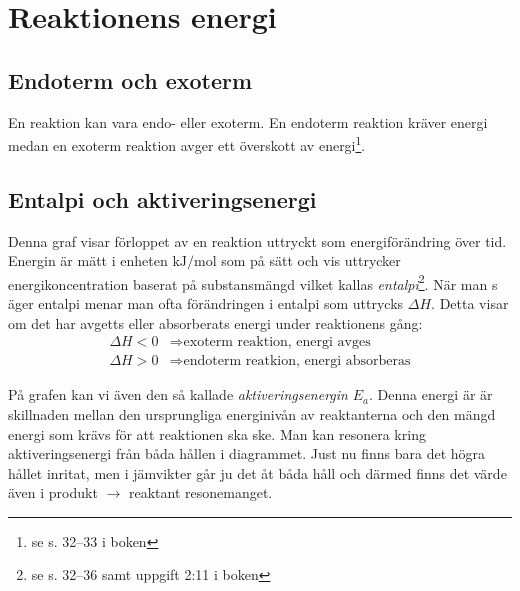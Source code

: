 \section{Reaktionens energi}

\subsection{Endoterm och exoterm}
\label{sec:endoexo}
En reaktion kan vara endo- eller exoterm. En endoterm reaktion kräver energi medan en exoterm reaktion avger ett överskott av energi\footnote{se s. 32--33 i boken}.

\subsection{Entalpi och aktiveringsenergi}
\label{sec:entalpiaktiveringse}
\begin{figure*}[h]
    \centering
\end{figure*}

\noindent Denna graf visar förloppet av en reaktion uttryckt som energiförändring över tid. Energin är mätt i enheten $\mathrm{kJ/mol}$ som på sätt och vis uttrycker energikoncentration baserat på substansmängd vilket kallas \emph{entalpi}\footnote{se s. 32--36 samt uppgift 2:11 i boken}. När man s
äger entalpi menar man ofta förändringen i entalpi som uttrycks $\Delta H$. Detta visar om det har avgetts eller absorberats energi under reaktionens gång:
\begin{align*}
    \Delta H < 0 &\Rightarrow \text{exoterm reaktion, energi avges} \\
    \Delta H > 0 &\Rightarrow \text{endoterm reatkion, energi absorberas}
\end{align*}

På grafen kan vi även den så kallade \emph{aktiveringsenergin} $E_a$. Denna energi är är skillnaden mellan den ursprungliga energinivån av reaktanterna och den mängd energi som krävs för att reaktionen ska ske. Man kan resonera kring aktiveringsenergi från båda hållen i diagrammet. Just nu finns bara det högra hållet inritat, men i jämvikter går ju det åt båda håll och därmed finns det värde även i produkt $\rightarrow$ reaktant resonemanget.